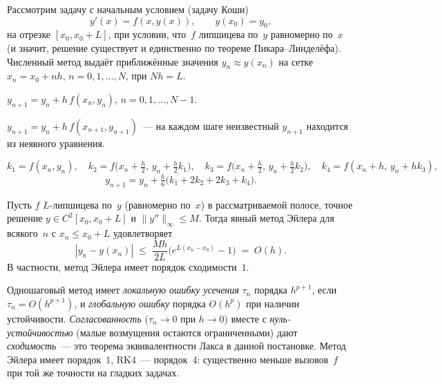 Рассмотрим задачу с начальным условием (задачу Коши)
\[
  y'(x) = f(x, y(x)),\qquad y(x_0) = y_0,
\]
на отрезке $[x_0, x_0 + L]$, при условии, что~$f$ липшицева по~$y$
равномерно по~$x$ (и значит, решение существует и единственно по
теореме Пикара--Линделёфа). Численный метод выдаёт приближённые
значения $y_n \approx y(x_n)$ на сетке $x_n = x_0 + n h$,
$n = 0, 1, \dots, N$, при $N h = L$.

\begin{definition}
\label{def:euler}
$y_{n+1} = y_n + h\, f(x_n, y_n)$, $n = 0, 1, \dots, N - 1$.
\end{definition}

\begin{definition}
\label{def:implicit-euler}
$y_{n+1} = y_n + h\, f(x_{n+1}, y_{n+1})$~--- на каждом шаге
неизвестный $y_{n+1}$ находится из неявного уравнения.
\end{definition}

\begin{definition}
\label{def:rk4}
\[
  k_1 = f(x_n, y_n),\quad
  k_2 = f\!\bigl(x_n + \tfrac{h}{2},\, y_n + \tfrac{h}{2} k_1\bigr),\quad
  k_3 = f\!\bigl(x_n + \tfrac{h}{2},\, y_n + \tfrac{h}{2} k_2\bigr),\quad
  k_4 = f(x_n + h,\, y_n + h k_3),
\]
\[
  y_{n+1} = y_n + \tfrac{h}{6}\bigl(k_1 + 2 k_2 + 2 k_3 + k_4\bigr).
\]
\end{definition}

\begin{theorem}
\label{thm:euler-convergence}
Пусть $f$ $L$-липшицева по~$y$ (равномерно по~$x$) в рассматриваемой
полосе, точное решение $y \in C^2[x_0, x_0 + L]$ и
$\|y''\|_{\infty} \leq M$. Тогда явный метод Эйлера для всякого~$n$
с $x_n \leq x_0 + L$ удовлетворяет
\[
  |y_n - y(x_n)| \;\leq\; \frac{M h}{2 L} \bigl(e^{L (x_n - x_0)} - 1\bigr) \;=\; O(h).
\]
В частности, метод Эйлера имеет порядок сходимости~$1$.
\end{theorem}

\begin{remark}
Одношаговый метод имеет \emph{локальную ошибку усечения} $\tau_n$
порядка $h^{p+1}$, если $\tau_n = O(h^{p+1})$, и \emph{глобальную
ошибку} порядка $O(h^p)$ при наличии устойчивости.
\emph{Согласованность} ($\tau_n \to 0$ при $h \to 0$) вместе с
\emph{нуль-устойчивостью} (малые возмущения остаются ограниченными)
дают \emph{сходимость}~--- это теорема эквивалентности Лакса в данной
постановке. Метод Эйлера имеет порядок~$1$, RK4~--- порядок~$4$:
существенно меньше вызовов~$f$ при той же точности на гладких задачах.
\end{remark}


